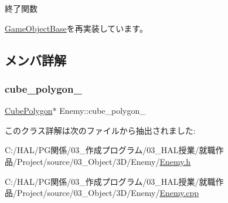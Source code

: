 終了関数 



\mbox{\hyperlink{class_game_object_base_a97e1bc277d7b1c0156d4735de29a022c}{Game\+Object\+Base}}を再実装しています。



\subsection{メンバ詳解}
\mbox{\label{class_enemy_a9a24b765d76b789cc678701886570511}} 
\subsubsection{\texorpdfstring{cube\+\_\+polygon\+\_\+}{cube\_polygon\_}}
{\footnotesize\ttfamily \mbox{\hyperlink{class_cube_polygon}{Cube\+Polygon}}$\ast$ Enemy\+::cube\+\_\+polygon\+\_\+}



このクラス詳解は次のファイルから抽出されました\+:\begin{DoxyCompactItemize}
\item 
C\+:/\+H\+A\+L/\+P\+G関係/03\+\_\+作成プログラム/03\+\_\+\+H\+A\+L授業/就職作品/\+Project/source/03\+\_\+\+Object/3\+D/\+Enemy/\mbox{\hyperlink{_enemy_8h}{Enemy.\+h}}\item 
C\+:/\+H\+A\+L/\+P\+G関係/03\+\_\+作成プログラム/03\+\_\+\+H\+A\+L授業/就職作品/\+Project/source/03\+\_\+\+Object/3\+D/\+Enemy/\mbox{\hyperlink{_enemy_8cpp}{Enemy.\+cpp}}\end{DoxyCompactItemize}
